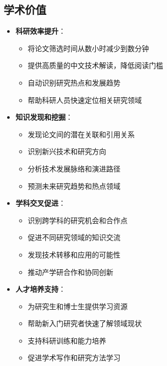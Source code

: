 \documentclass[12pt,a4paper]{article}
\begin{document}
\subsection{学术价值}
\begin{itemize}
    \item \textbf{科研效率提升}：
        \begin{itemize}
            \item 将论文筛选时间从数小时减少到数分钟
            \item 提供高质量的中文技术解读，降低阅读门槛
            \item 自动识别研究热点和发展趋势
            \item 帮助科研人员快速定位相关研究领域
        \end{itemize}
    
    \item \textbf{知识发现和挖掘}：
        \begin{itemize}
            \item 发现论文间的潜在关联和引用关系
            \item 识别新兴技术和研究方向
            \item 分析技术发展脉络和演进路径
            \item 预测未来研究趋势和热点领域
        \end{itemize}
    
    \item \textbf{学科交叉促进}：
        \begin{itemize}
            \item 识别跨学科的研究机会和合作点
            \item 促进不同研究领域的知识交流
            \item 发现技术转移和应用的可能性
            \item 推动产学研合作和协同创新
        \end{itemize}
    
    \item \textbf{人才培养支持}：
        \begin{itemize}
            \item 为研究生和博士生提供学习资源
            \item 帮助新入门研究者快速了解领域现状
            \item 支持科研训练和能力培养
            \item 促进学术写作和研究方法学习
        \end{itemize}
\end{itemize}
\end{document}
